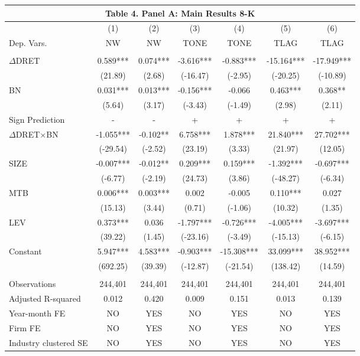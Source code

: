 \begin{table}[htbp] \label{T4PA}
  \centering
    \begin{tabular}{lcccccc}
    \multicolumn{7}{c}{\textbf{Table 4. Panel A: Main Results 8-K}} \\
    \midrule
      & (1) & (2) & (3) & (4) & (5) & (6) \\
    Dep. Vars. & NW & NW & TONE & TONE & TLAG & TLAG \\
    \midrule
      &   &   &   &   &   &  \\
    $\Delta$DRET & 0.589*** & 0.074*** & -3.616*** & -0.883*** & -15.164*** & -17.949*** \\
      & (21.89) & (2.68) & (-16.47) & (-2.95) & (-20.25) & (-10.89) \\
    BN & 0.031*** & 0.013*** & -0.156*** & -0.066 & 0.463*** & 0.368** \\
      & (5.64) & (3.17) & (-3.43) & (-1.49) & (2.98) & (2.11) \\
    \rowcolor[rgb]{ .933,  .925,  .882} Sign Prediction & - & - & + & + & + & + \\
    \rowcolor[rgb]{ .933,  .925,  .882} $\Delta$DRET$\times$BN & -1.055*** & -0.102** & 6.758*** & 1.878*** & 21.840*** & 27.702*** \\
    \rowcolor[rgb]{ .933,  .925,  .882}   & (-29.54) & (-2.52) & (23.19) & (3.33) & (21.97) & (12.05) \\
    SIZE & -0.007*** & -0.012** & 0.209*** & 0.159*** & -1.392*** & -0.697*** \\
      & (-6.77) & (-2.19) & (24.73) & (3.86) & (-48.27) & (-6.34) \\
    MTB & 0.006*** & 0.003*** & 0.002 & -0.005 & 0.110*** & 0.027 \\
      & (15.13) & (3.44) & (0.71) & (-1.06) & (10.32) & (1.35) \\
    LEV & 0.373*** & 0.036 & -1.797*** & -0.726*** & -4.005*** & -3.697*** \\
      & (39.22) & (1.45) & (-23.16) & (-3.49) & (-15.13) & (-6.15) \\
    Constant & 5.947*** & 4.583*** & -0.903*** & -15.308*** & 33.099*** & 38.952*** \\
      & (692.25) & (39.39) & (-12.87) & (-21.54) & (138.42) & (14.59) \\
      &   &   &   &   &   &  \\
    Observations & 244,401 & 244,401 & 244,401 & 244,401 & 244,401 & 244,401 \\
    Adjusted R-squared & 0.012 & 0.420 & 0.009 & 0.151 & 0.013 & 0.139 \\
    Year-month FE & NO & YES & NO & YES & NO & YES \\
    Firm FE & NO & YES & NO & YES & NO & YES \\
    Industry clustered SE & NO & YES & NO & YES & NO & YES \\
    \bottomrule
    \end{tabular}%
\end{table}%
